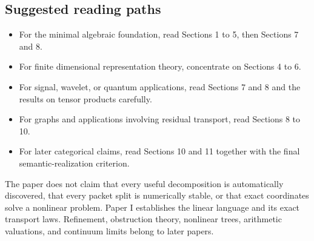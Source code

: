 \subsection*{Suggested reading paths}
\begin{itemize}
\item For the minimal algebraic foundation, read Sections 1 to 5, then Sections 7 and 8.
\item For finite dimensional representation theory, concentrate on Sections 4 to 6.
\item For signal, wavelet, or quantum applications, read Sections 7 and 8 and the results on tensor products carefully.
\item For graphs and applications involving residual transport, read Sections 8 to 10.
\item For later categorical claims, read Sections 10 and 11 together with the final semantic-realization criterion.
\end{itemize}

\begin{warningbox}
The paper does not claim that every useful decomposition is automatically discovered, that every packet split is numerically stable, or that exact coordinates solve a nonlinear problem.  Paper I establishes the linear language and its exact transport laws.  Refinement, obstruction theory, nonlinear trees, arithmetic valuations, and continuum limits belong to later papers.
\end{warningbox}

